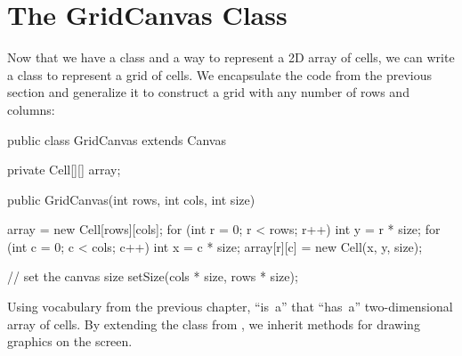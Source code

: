 %
%
%


\section{The GridCanvas Class}

Now that we have a  class and a way to represent a 2D array of cells, we can write a class to represent a grid of cells.
We encapsulate the code from the previous section and generalize it to construct a grid with any number of rows and columns:

\begin{code}
public class GridCanvas extends Canvas {
    private Cell[][] array;

    public GridCanvas(int rows, int cols, int size) {
        array = new Cell[rows][cols];
        for (int r = 0; r < rows; r++) {
            int y = r * size;
            for (int c = 0; c < cols; c++) {
                int x = c * size;
                array[r][c] = new Cell(x, y, size);
            }
        }

        // set the canvas size
        setSize(cols * size, rows * size);
    }
}
\end{code}


Using vocabulary from the previous chapter,  ``is~a''  that ``has~a'' two-dimensional array of cells.
By extending the  class from , we inherit methods for drawing graphics on the screen.

